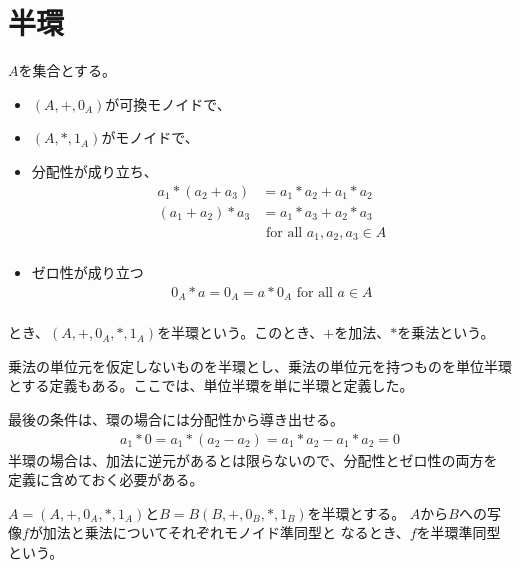 \section{半環}\label{s1:半環} %
	\begin{definition}[半環]\label{def:半環} %
		$A$を集合とする。
		\begin{itemize}
			\item $(A,+,0_A)$が可換モノイドで、
			\item $(A,*,1_A)$がモノイドで、
			\item 分配性が成り立ち、
			\begin{equation*}\begin{split} %
				a_1*(a_2+a_3) &= a_1*a_2+a_1*a_2 \\
				(a_1+a_2)*a_3 &= a_1*a_3+a_2*a_3 \\
				& \text{ for all }a_1,a_2,a_3 \in A \\
			\end{split}\end{equation*} %
			\item ゼロ性が成り立つ
			\begin{equation*}\begin{split} %
				0_A*a = 0_A = a*0_A \text{ for all }a\in A \\
			\end{split}\end{equation*} %
		\end{itemize}
		とき、$(A,+,0_A,*,1_A)$を半環という。このとき、$+$を加法、$*$を乗法という。
	\end{definition} %

	乗法の単位元を仮定しないものを半環とし、乗法の単位元を持つものを単位半環
	とする定義もある。ここでは、単位半環を単に半環と定義した。

	最後の条件は、環の場合には分配性から導き出せる。
	\begin{equation*}\begin{split} %
		a_1*0=a_1*(a_2-a_2)=a_1*a_2-a_1*a_2=0
	\end{split}\end{equation*} %
	半環の場合は、加法に逆元があるとは限らないので、分配性とゼロ性の両方を
	定義に含めておく必要がある。

	\begin{definition}[半環準同型]\label{def:半環準同型} %
		$A=(A,+,0_A,*,1_A)$と$B=B(B,+,0_B,*,1_B)$を半環とする。
		$A$から$B$への写像$f$が加法と乗法についてそれぞれモノイド準同型と
		なるとき、$f$を半環準同型という。
	\end{definition} %

